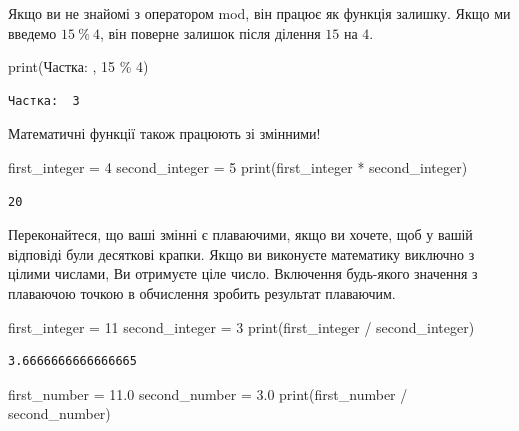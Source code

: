 \documentclass[
  letterpaper,
]{report}
\newenvironment{Shaded}{\begin{snugshade}}{\end{snugshade}}
\newcommand{\BuiltInTok}[1]{\textcolor[rgb]{0.00,0.23,0.31}{#1}}
\newcommand{\DecValTok}[1]{\textcolor[rgb]{0.68,0.00,0.00}{#1}}
\newcommand{\FloatTok}[1]{\textcolor[rgb]{0.68,0.00,0.00}{#1}}
\newcommand{\NormalTok}[1]{\textcolor[rgb]{0.00,0.23,0.31}{#1}}
\newcommand{\OperatorTok}[1]{\textcolor[rgb]{0.37,0.37,0.37}{#1}}
\newcommand{\StringTok}[1]{\textcolor[rgb]{0.13,0.47,0.30}{#1}}
\begin{document}
Якщо ви не знайомі з оператором mod, він працює як функція залишку. Якщо
ми введемо \(15 \ \% \  4\), він поверне залишок після ділення \(15\) на
\(4\).

\begin{Shaded}
\begin{Highlighting}[]
\BuiltInTok{print}\NormalTok{(}\StringTok{\textquotesingle{}Частка: \textquotesingle{}}\NormalTok{, }\DecValTok{15} \OperatorTok{\%} \DecValTok{4}\NormalTok{)}
\end{Highlighting}
\end{Shaded}

\begin{verbatim}
Частка:  3
\end{verbatim}

Математичні функції також працюють зі змінними!

\begin{Shaded}
\begin{Highlighting}[]
\NormalTok{first\_integer }\OperatorTok{=} \DecValTok{4}
\NormalTok{second\_integer }\OperatorTok{=} \DecValTok{5}
\BuiltInTok{print}\NormalTok{(first\_integer }\OperatorTok{*}\NormalTok{ second\_integer)}
\end{Highlighting}
\end{Shaded}

\begin{verbatim}
20
\end{verbatim}

Переконайтеся, що ваші змінні є плаваючими, якщо ви хочете, щоб у вашій
відповіді були десяткові крапки. Якщо ви виконуєте математику виключно з
цілими числами, Ви отримуєте ціле число. Включення будь-якого значення з
плаваючою точкою в обчислення зробить результат плаваючим.

\begin{Shaded}
\begin{Highlighting}[]
\NormalTok{first\_integer }\OperatorTok{=} \DecValTok{11}
\NormalTok{second\_integer }\OperatorTok{=} \DecValTok{3}
\BuiltInTok{print}\NormalTok{(first\_integer }\OperatorTok{/}\NormalTok{ second\_integer)}
\end{Highlighting}
\end{Shaded}

\begin{verbatim}
3.6666666666666665
\end{verbatim}

\begin{Shaded}
\begin{Highlighting}[]
\NormalTok{first\_number }\OperatorTok{=} \FloatTok{11.0}
\NormalTok{second\_number }\OperatorTok{=} \FloatTok{3.0}
\BuiltInTok{print}\NormalTok{(first\_number }\OperatorTok{/}\NormalTok{ second\_number)}
\end{Highlighting}
\end{Shaded}
\end{document}
